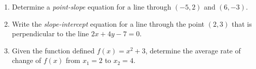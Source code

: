 

\begin{enumerate}
\item  Determine a \emph{point-slope} equation for a line through $(-5,2)$ and $(6,-3)$.

\vfill
\item Write the \emph{slope-intercept} equation for a line through the point $(2,3)$ that is perpendicular to the line $2x+4y-7=0$.

\vfill


\item Given the function defined $f(x)=x^2+3$, determine the average rate of change of $f(x)$ from $x_1=2$ to $x_2=4$.
\vfill

\end{enumerate}



